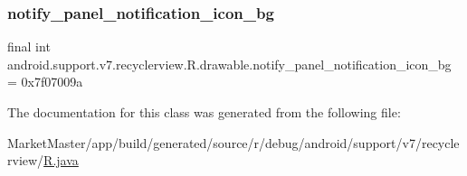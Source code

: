 \subsubsection{\texorpdfstring{notify\+\_\+panel\+\_\+notification\+\_\+icon\+\_\+bg}{notify\_panel\_notification\_icon\_bg}}
{\footnotesize\ttfamily final int android.\+support.\+v7.\+recyclerview.\+R.\+drawable.\+notify\+\_\+panel\+\_\+notification\+\_\+icon\+\_\+bg = 0x7f07009a\hspace{0.3cm}{\ttfamily [static]}}



The documentation for this class was generated from the following file\+:\begin{DoxyCompactItemize}
\item 
Market\+Master/app/build/generated/source/r/debug/android/support/v7/recyclerview/\mbox{\hyperlink{debug_2android_2support_2v7_2recyclerview_2R_8java}{R.\+java}}\end{DoxyCompactItemize}
